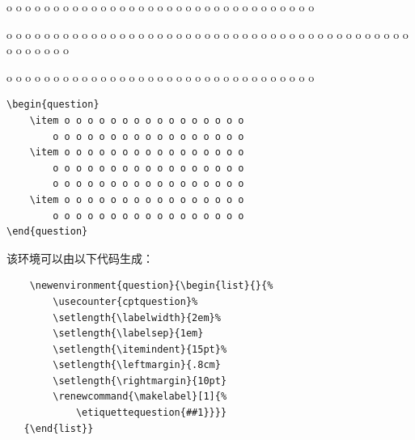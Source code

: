\begin{codelist}[9.19]{
    \begin{question}
        \item o o o o o o o o o o o o o o o o
            o o o o o o o o o o o o o o o o o
        \item o o o o o o o o o o o o o o o o
            o o o o o o o o o o o o o o o o o
            o o o o o o o o o o o o o o o o o
        \item o o o o o o o o o o o o o o o o
            o o o o o o o o o o o o o o o o o
    \end{question}
}\begin{verbatim}
\begin{question}
    \item o o o o o o o o o o o o o o o o
        o o o o o o o o o o o o o o o o o
    \item o o o o o o o o o o o o o o o o
        o o o o o o o o o o o o o o o o o
        o o o o o o o o o o o o o o o o o
    \item o o o o o o o o o o o o o o o o
        o o o o o o o o o o o o o o o o o
\end{question}
\end{verbatim}
\end{codelist}

该环境可以由以下代码生成：

\begin{dmd}
\begin{verbatim}
    \newenvironment{question}{\begin{list}{}{% 
        \usecounter{cptquestion}% 
        \setlength{\labelwidth}{2em}% 
        \setlength{\labelsep}{1em} 
        \setlength{\itemindent}{15pt}% 
        \setlength{\leftmargin}{.8cm} 
        \setlength{\rightmargin}{10pt} 
        \renewcommand{\makelabel}[1]{%
            \etiquettequestion{##1}}}}
   {\end{list}}
\end{verbatim}
\end{dmd}